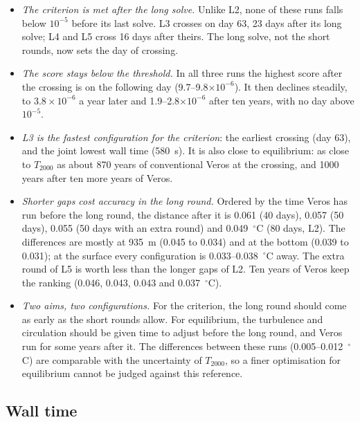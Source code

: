\documentclass{article}
\begin{document}
\begin{itemize}
\item \emph{The criterion is met after the long solve.} Unlike L2, none of these runs falls below $10^{-5}$ before its last solve. L3 crosses on day 63, 23 days after its long solve; L4 and L5 cross 16 days after theirs. The long solve, not the short rounds, now sets the day of crossing.
\item \emph{The score stays below the threshold.} In all three runs the highest score after the crossing is on the following day (9.7--9.8$\times10^{-6}$). It then declines steadily, to $3.8\times10^{-6}$ a year later and 1.9--2.8$\times10^{-6}$ after ten years, with no day above $10^{-5}$.
\item \emph{L3 is the fastest configuration for the criterion}: the earliest crossing (day 63), and the joint lowest wall time (580~s). It is also close to equilibrium: as close to $T_{2000}$ as about 870 years of conventional Veros at the crossing, and 1000 years after ten more years of Veros.
\item \emph{Shorter gaps cost accuracy in the long round.} Ordered by the time Veros has run before the long round, the distance after it is 0.061 (40 days), 0.057 (50 days), 0.055 (50 days with an extra round) and 0.049~$^\circ$C (80 days, L2). The differences are mostly at 935~m (0.045 to 0.034) and at the bottom (0.039 to 0.031); at the surface every configuration is 0.033--0.038~$^\circ$C away. The extra round of L5 is worth less than the longer gaps of L2. Ten years of Veros keep the ranking (0.046, 0.043, 0.043 and 0.037~$^\circ$C).
\item \emph{Two aims, two configurations.} For the criterion, the long round should come as early as the short rounds allow. For equilibrium, the turbulence and circulation should be given time to adjust before the long round, and Veros run for some years after it. The differences between these runs (0.005--0.012~$^\circ$C) are comparable with the uncertainty of $T_{2000}$, so a finer optimisation for equilibrium cannot be judged against this reference.
\end{itemize}

\subsection{Wall time}\label{sec:wall}
\end{document}
